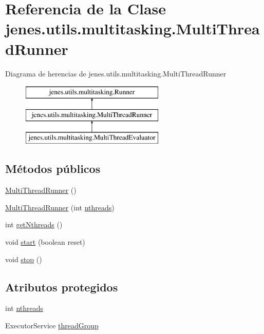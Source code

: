 \hypertarget{classjenes_1_1utils_1_1multitasking_1_1_multi_thread_runner}{\section{Referencia de la Clase jenes.\-utils.\-multitasking.\-Multi\-Thread\-Runner}
\label{classjenes_1_1utils_1_1multitasking_1_1_multi_thread_runner}
}
Diagrama de herencias de jenes.\-utils.\-multitasking.\-Multi\-Thread\-Runner\begin{figure}[H]
\begin{center}
\leavevmode
\includegraphics[height=3.000000cm]{classjenes_1_1utils_1_1multitasking_1_1_multi_thread_runner}
\end{center}
\end{figure}
\subsection*{Métodos públicos}
\begin{DoxyCompactItemize}
\item 
\hyperlink{classjenes_1_1utils_1_1multitasking_1_1_multi_thread_runner_ab0815486f3159f086cd06ccab94df319}{Multi\-Thread\-Runner} ()
\item 
\hyperlink{classjenes_1_1utils_1_1multitasking_1_1_multi_thread_runner_a6319362b08c06d8bf26989407d223c31}{Multi\-Thread\-Runner} (int \hyperlink{classjenes_1_1utils_1_1multitasking_1_1_multi_thread_runner_aa20fe700a6b2abd3694b4a1d5629db8f}{nthreads})
\item 
int \hyperlink{classjenes_1_1utils_1_1multitasking_1_1_multi_thread_runner_a69370630a898026070fe8e806cec8fe0}{get\-Nthreads} ()
\item 
void \hyperlink{classjenes_1_1utils_1_1multitasking_1_1_multi_thread_runner_a52fc59a28c3187e84b871b9b823b7f43}{start} (boolean reset)
\item 
void \hyperlink{classjenes_1_1utils_1_1multitasking_1_1_multi_thread_runner_a5f00a9b63ff1322d586ad62ec060d597}{stop} ()
\end{DoxyCompactItemize}
\subsection*{Atributos protegidos}
\begin{DoxyCompactItemize}
\item 
int \hyperlink{classjenes_1_1utils_1_1multitasking_1_1_multi_thread_runner_aa20fe700a6b2abd3694b4a1d5629db8f}{nthreads}
\item 
Executor\-Service \hyperlink{classjenes_1_1utils_1_1multitasking_1_1_multi_thread_runner_afd9939cc7a261bd4bb6c8f3de6f58337}{thread\-Group}
\end{DoxyCompactItemize}


